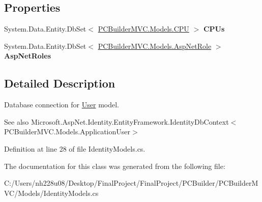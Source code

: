 \subsection*{Properties}
\begin{DoxyCompactItemize}
\item 
System.\+Data.\+Entity.\+Db\+Set$<$ \hyperlink{class_p_c_builder_m_v_c_1_1_models_1_1_c_p_u}{P\+C\+Builder\+M\+V\+C.\+Models.\+C\+PU} $>$ {\bfseries C\+P\+Us}\hypertarget{class_p_c_builder_m_v_c_1_1_models_1_1_application_db_context_abe6c40c6be3a6fd178405e5dcc7a5b7f}{}\label{class_p_c_builder_m_v_c_1_1_models_1_1_application_db_context_abe6c40c6be3a6fd178405e5dcc7a5b7f}

\item 
System.\+Data.\+Entity.\+Db\+Set$<$ \hyperlink{class_p_c_builder_m_v_c_1_1_models_1_1_asp_net_role}{P\+C\+Builder\+M\+V\+C.\+Models.\+Asp\+Net\+Role} $>$ {\bfseries Asp\+Net\+Roles}\hypertarget{class_p_c_builder_m_v_c_1_1_models_1_1_application_db_context_a3999bd7ef81ac8511b08b2b067744c1a}{}\label{class_p_c_builder_m_v_c_1_1_models_1_1_application_db_context_a3999bd7ef81ac8511b08b2b067744c1a}

\end{DoxyCompactItemize}


\subsection{Detailed Description}
Database connection for \hyperlink{class_p_c_builder_m_v_c_1_1_models_1_1_user}{User} model. 

\begin{DoxySeeAlso}{See also}
Microsoft.\+Asp\+Net.\+Identity.\+Entity\+Framework.\+Identity\+Db\+Context$<$\+P\+C\+Builder\+M\+V\+C.\+Models.\+Application\+User$>$


\end{DoxySeeAlso}


Definition at line 28 of file Identity\+Models.\+cs.



The documentation for this class was generated from the following file\+:\begin{DoxyCompactItemize}
\item 
C\+:/\+Users/nh228u08/\+Desktop/\+Final\+Project/\+Final\+Project/\+P\+C\+Builder/\+P\+C\+Builder\+M\+V\+C/\+Models/Identity\+Models.\+cs\end{DoxyCompactItemize}
